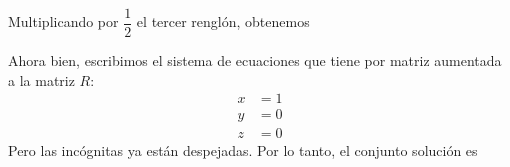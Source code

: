 \begin{examplebox}{}{}
\begin{matrizn}
    \end{matrizn}
    Multiplicando por $\dfrac{1}{2}$ el tercer renglón, obtenemos
    \begin{matrizn}
    \end{matrizn}
    Ahora bien, escribimos el sistema de ecuaciones que tiene por matriz aumentada a la matriz $R$:
    \begin{align*}
        x & = 1 \\
        y & = 0 \\
        z & = 0
    \end{align*}
    Pero las incógnitas ya están despejadas. Por lo tanto, el conjunto solución es
    \begin{matrizn}
    \end{matrizn}
\end{examplebox}

